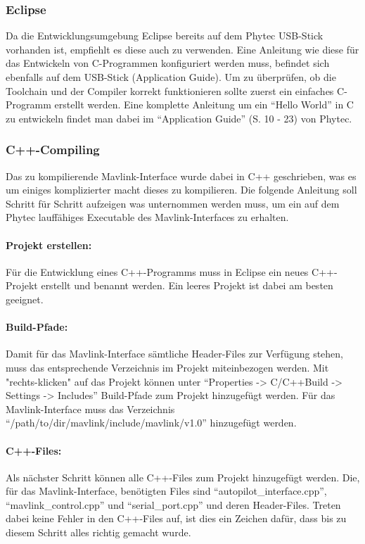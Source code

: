\documentclass[12pt]{article} %
\begin{document}
	\subsubsection{Eclipse}
	Da die Entwicklungsumgebung Eclipse bereits auf dem Phytec USB-Stick vorhanden ist, empfiehlt es diese auch zu verwenden. Eine Anleitung wie diese für das Entwickeln von C-Programmen konfiguriert werden muss, befindet sich ebenfalls auf dem USB-Stick (Application Guide). Um zu überprüfen, ob die Toolchain und der Compiler korrekt funktionieren sollte zuerst ein einfaches C-Programm erstellt werden. Eine komplette Anleitung um ein "`Hello World"' in C zu entwickeln findet man dabei im "`Application Guide"' (S. 10 - 23) von Phytec.
	
	\subsubsection{C++-Compiling}
	Das zu kompilierende Mavlink-Interface wurde dabei in C++ geschrieben, was es um einiges komplizierter macht dieses zu kompilieren. Die folgende Anleitung soll Schritt für Schritt aufzeigen was unternommen werden muss, um ein auf dem Phytec lauffähiges Executable des Mavlink-Interfaces zu erhalten.
	
	\paragraph*{Projekt erstellen:}
	Für die Entwicklung eines C++-Programms muss in Eclipse ein neues C++-Projekt erstellt und benannt werden. Ein leeres Projekt ist dabei am besten geeignet.
	
	\paragraph*{Build-Pfade:}
	Damit für das Mavlink-Interface sämtliche Header-Files zur Verfügung stehen, muss das entsprechende Verzeichnis im Projekt miteinbezogen werden. Mit "rechts-klicken" auf das Projekt können unter "`Properties -> C/C++Build -> Settings -> Includes"' Build-Pfade  zum Projekt hinzugefügt werden. Für das Mavlink-Interface muss das Verzeichnis "`/path/to/dir/mavlink/include/mavlink/v1.0"' hinzugefügt werden.
	
	\paragraph*{C++-Files:} 
	Als nächster Schritt können alle C++-Files zum Projekt hinzugefügt werden. Die, für das Mavlink-Interface, benötigten Files sind "`autopilot\_interface.cpp"', "`mavlink\_control.cpp"' und "`serial\_port.cpp"' und deren Header-Files. Treten dabei keine Fehler in den C++-Files auf, ist dies ein Zeichen dafür, dass bis zu diesem Schritt alles richtig gemacht wurde.
	
\end{document}
